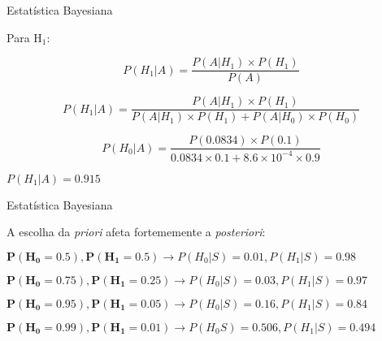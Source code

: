 \documentclass{beamer}\usepackage[]{graphicx}\usepackage[]{color}
\begin{document}
\begin{frame}{Estatística Bayesiana}

Para H$_1$:

\begin{equation*}
P(H_1 | A) = \frac{P(A | H_1) \times P(H_1)}{P(A)}
\end{equation*}

\begin{equation*}
P(H_1 | A) = \frac{P(A | H_1) \times P(H_1)}{P(A | H_1) \times P(H_1) + P(A | H_0) \times P(H_0)}
\end{equation*}

\begin{equation*}
P(H_0 | A) = \frac{P(0.0834) \times P(0.1)}{0.0834 \times 0.1 +\ensuremath{8.6\times 10^{-4}} \times 0.9}
\end{equation*}

$P(H_1|A) = 0.915$
 
\end{frame}



\begin{frame}{Estatística Bayesiana}

A escolha da \emph{priori} afeta fortememente a \emph{posteriori}:
\vfill

\begin{small}

$\mathbf{P(H_0=0.5),P(H_1=0.5)} \rightarrow P(H_0|S) = 0.01, P(H_1|S) = 0.98$

\vfill

$\mathbf{P(H_0=0.75),P(H_1=0.25)} \rightarrow P(H_0|S) = 0.03 , P(H_1|S) = 0.97$

\vfill

$\mathbf{P(H_0=0.95),P(H_1=0.05)} \rightarrow P(H_0|S) = 0.16, P(H_1|S) = 0.84$

\vfill

$\mathbf{P(H_0=0.99),P(H_1=0.01)} \rightarrow P(H_0S) = 0.506, P(H_1|S) = 0.494$

\end{small}

\end{frame}
\end{document}
